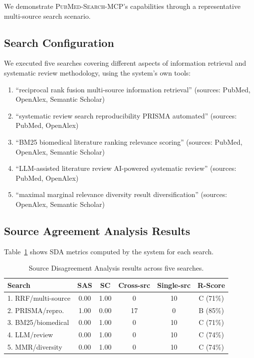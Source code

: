\documentclass[11pt,a4paper]{article}
\newcommand{\system}{\textsc{PubMed-Search-MCP}}
\begin{document}
We demonstrate \system{}'s capabilities through a representative multi-source search scenario.

\subsection{Search Configuration}

We executed five searches covering different aspects of information retrieval and systematic review methodology, using the system's own tools:

\begin{enumerate}
    \item ``reciprocal rank fusion multi-source information retrieval'' (sources: PubMed, OpenAlex, Semantic Scholar)
    \item ``systematic review search reproducibility PRISMA automated'' (sources: PubMed, OpenAlex)
    \item ``BM25 biomedical literature ranking relevance scoring'' (sources: PubMed, OpenAlex, Semantic Scholar)
    \item ``LLM-assisted literature review AI-powered systematic review'' (sources: PubMed, OpenAlex)
    \item ``maximal marginal relevance diversity result diversification'' (sources: OpenAlex, Semantic Scholar)
\end{enumerate}

\subsection{Source Agreement Analysis Results}

Table~\ref{tab:sda_results} shows SDA metrics computed by the system for each search.

\begin{table}[htbp]
\centering
\caption{Source Disagreement Analysis results across five searches.}
\label{tab:sda_results}
\begin{tabular}{lccccc}
\toprule
\textbf{Search} & \textbf{SAS} & \textbf{SC} & \textbf{Cross-src} & \textbf{Single-src} & \textbf{R-Score} \\
\midrule
1. RRF/multi-source & 0.00 & 1.00 & 0 & 10 & C (71\%) \\
2. PRISMA/repro.    & 1.00 & 0.00 & 17 & 0 & B (85\%) \\
3. BM25/biomedical  & 0.00 & 1.00 & 0 & 10 & C (71\%) \\
4. LLM/review       & 0.00 & 1.00 & 0 & 10 & C (74\%) \\
5. MMR/diversity    & 0.00 & 1.00 & 0 & 10 & C (74\%) \\
\bottomrule
\end{tabular}
\end{table}
\end{document}
